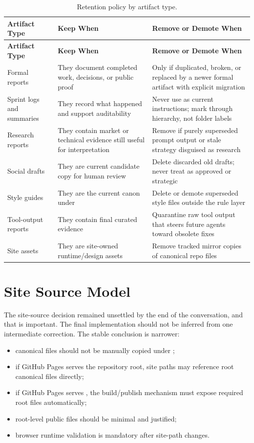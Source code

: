 \documentclass[a4paper,11pt,openany]{report}
\newcommand{\safePath}[1]{\texttt{\detokenize{#1}}}
\begin{document}
\begin{longtable}{p{} p{} p{}}
\caption{Retention policy by artifact type.}
\label{tab:retention-policy}\\
\toprule
\textbf{Artifact Type} & \textbf{Keep When} & \textbf{Remove or Demote When} \\
\midrule
\endfirsthead
\toprule
\textbf{Artifact Type} & \textbf{Keep When} & \textbf{Remove or Demote When} \\
\midrule
\endhead
Formal reports & They document completed work, decisions, or public proof & Only if duplicated, broken, or replaced by a newer formal artifact with explicit migration \\
Sprint logs and summaries & They record what happened and support auditability & Never use as current instructions; mark through hierarchy, not folder labels \\
Research reports & They contain market or technical evidence still useful for interpretation & Remove if purely superseded prompt output or stale strategy disguised as research \\
Social drafts & They are current candidate copy for human review & Delete discarded old drafts; never treat as approved or strategic \\
Style guides & They are the current canon under \safePath{agents/rules/core/} & Delete or demote superseded style files outside the rule layer \\
Tool-output reports & They contain final curated evidence & Quarantine raw tool output that steers future agents toward obsolete fixes \\
Site assets & They are site-owned runtime/design assets & Remove tracked mirror copies of canonical repo files \\
\bottomrule
\end{longtable}

\section{Site Source Model}

The site-source decision remained unsettled by the end of the conversation, and
that is important. The final implementation should not be inferred from one
intermediate correction. The stable conclusion is narrower:

\begin{itemize}
  \item canonical files should not be manually copied under \safePath{site/};
  \item if GitHub Pages serves the repository root, site paths may reference
    root canonical files directly;
  \item if GitHub Pages serves \safePath{site/}, the build/publish mechanism must
    expose required root files automatically;
  \item root-level public files should be minimal and justified;
  \item browser runtime validation is mandatory after site-path changes.
\end{itemize}
\end{document}
